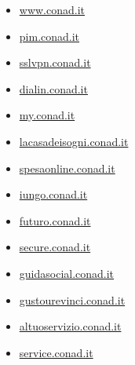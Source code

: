 \documentclass{article}
\begin{document}
\begin{itemize}
            
            \item \href{ https://www.conad.it/ricerca-negozi?utm\_source=crm\&utm\_medium=email\&utm\_content=124647515\&utm\_campaign=\_ }{ www.conad.it }
        
            
            \item \href{ https://pim.conad.it/ }{ pim.conad.it }
        
            
            \item \href{ http://sslvpn.conad.it }{ sslvpn.conad.it }
        
            
            \item \href{ https://dialin.conad.it/ }{ dialin.conad.it }
        
            
            \item \href{ https://my.conad.it/login.html?cb=https:/vincinatale.conad.it }{ my.conad.it }
        
            
            \item \href{ http://lacasadeisogni.conad.it/ }{ lacasadeisogni.conad.it }
        
            
            \item \href{ https://spesaonline.conad.it/ }{ spesaonline.conad.it }
        
            
            \item \href{ http://iungo.conad.it }{ iungo.conad.it }
        
            
            \item \href{ https://futuro.conad.it/ }{ futuro.conad.it }
        
            
            \item \href{ http://secure.conad.it/ }{ secure.conad.it }
        
            
            \item \href{ https://guidasocial.conad.it/ }{ guidasocial.conad.it }
        
            
            \item \href{ http://gustourevinci.conad.it/vincitori2020/gustourevinci.htm }{ gustourevinci.conad.it }
        
            
            \item \href{ https://altuoservizio.conad.it/ }{ altuoservizio.conad.it }
        
            
            \item \href{ http://service.conad.it }{ service.conad.it }
        

\end{itemize}
\end{document}
